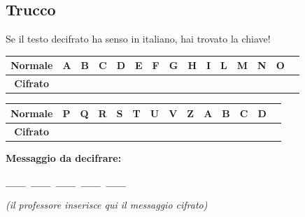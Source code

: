 \documentclass[12pt,a4paper]{article}
\begin{document}
\subsection*{Trucco}
Se il testo decifrato ha senso in italiano, hai trovato la chiave!

\vspace{1em}
\begin{center}
\renewcommand{\arraystretch}{1.8}
\begin{tabular}{|c|*{14}{c|}}
\hline
\textbf{Normale} &
A&B&C&D&E&F&G&H&I&L&M&N&O\\
\hline
\textbf{Cifrato} &
\phantom{A}&\phantom{A}&\phantom{A}&\phantom{A}&\phantom{A}&
\phantom{A}&\phantom{A}&\phantom{A}&\phantom{A}&\phantom{A}&
\phantom{A}&\phantom{A}&\phantom{A}\\
\hline
\end{tabular}

\vspace{0.4em}

\begin{tabular}{|c|*{13}{c|}}
\hline
\textbf{Normale} &
P&Q&R&S&T&U&V&Z&A&B&C&D\\
\hline
\textbf{Cifrato} &
\phantom{A}&\phantom{A}&\phantom{A}&\phantom{A}&\phantom{A}&
\phantom{A}&\phantom{A}&\phantom{A}&\phantom{A}&\phantom{A}&
\phantom{A}&\phantom{A}\\
\hline
\end{tabular}
\end{center}

\vspace{1em}
\noindent\textbf{Messaggio da decifrare:}
\vspace{0.5em}

\begin{center}
\large\texttt{\_\_\_\_ \_\_\_\_ \_\_\_\_ \_\_\_\_ \_\_\_\_}
\end{center}
\textit{(il professore inserisce qui il messaggio cifrato)}
\end{document}
